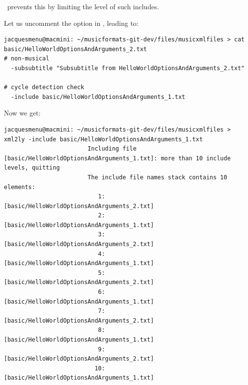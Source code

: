 \mf\ prevents this by limiting the level of such includes.

Let us uncomment the  option in , leading to:
\begin{lstlisting}[language=Terminal]
jacquesmenu@macmini: ~/musicformats-git-dev/files/musicxmlfiles > cat basic/HelloWorldOptionsAndArguments_2.txt
# non-musical
  -subsubtitle "Subsubtitle from HelloWorldOptionsAndArguments_2.txt"

# cycle detection check
  -include basic/HelloWorldOptionsAndArguments_1.txt
\end{lstlisting}

Now we get:
\begin{lstlisting}[language=Terminal]
jacquesmenu@macmini: ~/musicformats-git-dev/files/musicxmlfiles > xml2ly -include basic/HelloWorldOptionsAndArguments_1.txt
                        Including file [basic/HelloWorldOptionsAndArguments_1.txt]: more than 10 include levels, quitting
                        The include file names stack contains 10 elements:
                           1: [basic/HelloWorldOptionsAndArguments_2.txt]
                           2: [basic/HelloWorldOptionsAndArguments_1.txt]
                           3: [basic/HelloWorldOptionsAndArguments_2.txt]
                           4: [basic/HelloWorldOptionsAndArguments_1.txt]
                           5: [basic/HelloWorldOptionsAndArguments_2.txt]
                           6: [basic/HelloWorldOptionsAndArguments_1.txt]
                           7: [basic/HelloWorldOptionsAndArguments_2.txt]
                           8: [basic/HelloWorldOptionsAndArguments_1.txt]
                           9: [basic/HelloWorldOptionsAndArguments_2.txt]
                          10: [basic/HelloWorldOptionsAndArguments_1.txt]
\end{lstlisting}


